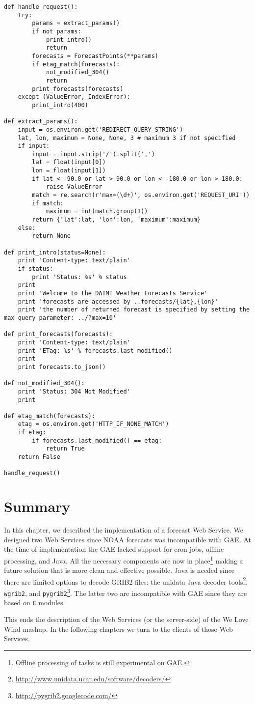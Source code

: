 \begin{lstlisting}[caption=Forecast point CGI controller, label=lst:cgi_forecast_point_controller]
def handle_request():
    try:
        params = extract_params()
        if not params:
            print_intro()
            return
        forecasts = ForecastPoints(**params)
        if etag_match(forecasts):
            not_modified_304()
            return
        print_forecasts(forecasts)
    except (ValueError, IndexError):
        print_intro(400)

def extract_params():
    input = os.environ.get('REDIRECT_QUERY_STRING')
    lat, lon, maximum = None, None, 3 # maximum 3 if not specified
    if input:
        input = input.strip('/').split(',')
        lat = float(input[0])
        lon = float(input[1])
        if lat < -90.0 or lat > 90.0 or lon < -180.0 or lon > 180.0:
            raise ValueError
        match = re.search(r'max=(\d+)', os.environ.get('REQUEST_URI'))
        if match:
            maximum = int(match.group(1))
        return {'lat':lat, 'lon':lon, 'maximum':maximum}
    else:
        return None

def print_intro(status=None):
    print 'Content-type: text/plain'
    if status:
        print 'Status: %s' % status
    print
    print 'Welcome to the DAIMI Weather Forecasts Service'
    print 'forecasts are accessed by ..forecasts/{lat},{lon}'
    print 'the number of returned forecast is specified by setting the max query parameter: ../?max=10'

def print_forecasts(forecasts):
    print 'Content-type: text/plain'
    print 'ETag: %s' % forecasts.last_modified()
    print
    print forecasts.to_json()

def not_modified_304():
    print 'Status: 304 Not Modified'
    print

def etag_match(forecasts):
    etag = os.environ.get('HTTP_IF_NONE_MATCH')
    if etag:
        if forecasts.last_modified() == etag:
            return True
    return False

handle_request()  
\end{lstlisting}

\section{Summary}
In this chapter, we described the implementation of a forecast Web Service. We
designed two Web Services since NOAA forecasts was incompatible with GAE. At the
time of implementation the GAE lacked support for cron jobs, offline processing,
and Java. All the necessary components are now in place\footnote{Offline
processing of tasks is still experimental on GAE.} making a future solution that
is more clean and effective possible. Java is needed since there are limited
options to decode GRIB2 files: the unidata Java decoder
tools\footnote{\url{http://www.unidata.ucar.edu/software/decoders/}},
\verb|wgrib2|, and
\verb|pygrib2|\footnote{\url{http://pygrib2.googlecode.com/}}. The latter two are
incompatible with GAE since they are based on \verb|C| modules.

This ends the description of the Web Services (or the server-side) of the We Love
Wind mashup. In the following chapters we turn to the clients of those Web
Services.
